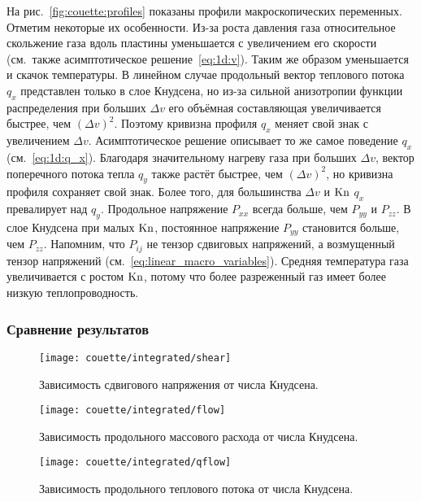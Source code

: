 На рис.~\ref{fig:couette:profiles} показаны профили макроскопических переменных.
Отметим некоторые их особенности. Из-за роста давления газа относительное скольжение газа вдоль пластины
уменьшается с увеличением его скорости (см.~также асимптотическое решение~\eqref{eq:1d:v}).
Таким же образом уменьшается и скачок температуры.
В линейном случае продольный вектор теплового потока \(q_x\) представлен только в слое Кнудсена,
но из-за сильной анизотропии функции распределения при больших \(\Delta{v}\)
его объёмная составляющая увеличивается быстрее, чем \((\Delta{v})^2\).
Поэтому кривизна профиля \(q_x\) меняет свой знак с увеличением \(\Delta{v}\).
Асимптотическое решение описывает то же самое поведение \(q_x\) (см.~\eqref{eq:1d:q_x}).
Благодаря значительному нагреву газа при больших \(\Delta{v}\),
вектор поперечного потока тепла \(q_y\) также растёт быстрее, чем \((\Delta{v})^2\),
но кривизна профиля сохраняет свой знак.
Более того, для большинства \(\Delta{v}\) и \(\mathrm{Kn}\) \(q_x\) превалирует над \(q_y\).
Продольное напряжение \(P_{xx}\) всегда больше, чем \(P_{yy}\) и \(P_{zz}\).
В слое Кнудсена при малых \(\mathrm{Kn}\), постоянное напряжение \(P_{yy}\) становится больше, чем \(P_{zz}\).
Напомним, что \(P_{ij}\) не тензор сдвиговых напряжений, а возмущенный тензор напряжений
(см.~\eqref{eq:linear_macro_variables}).
Средняя температура газа увеличивается с ростом \(\mathrm{Kn}\),
потому что более разреженный газ имеет более низкую теплопроводность.

\subsubsection{Сравнение результатов}

\begin{figure}
    \centering
    \texttt{[image: couette/integrated/shear]}
    \caption{Зависимость сдвигового напряжения от числа Кнудсена.}
    \label{fig:couette:shear}
\end{figure}

\begin{figure}
    \centering
    \texttt{[image: couette/integrated/flow]}
    \caption{Зависимость продольного массового расхода от числа Кнудсена.}
    \label{fig:couette:flow}
\end{figure}

\begin{figure}
    \centering
    \texttt{[image: couette/integrated/qflow]}
    \caption{Зависимость продольного теплового потока от числа Кнудсена.}
    \label{fig:couette:qflow}
\end{figure}

